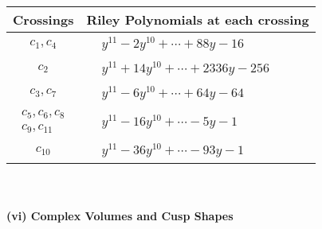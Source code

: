 \documentclass[1p]{elsarticle_modified}
\theoremstyle{definition}
\begin{document}
\begin{tabular}{m{50pt}|m{274pt}}
Crossings & \hspace{64pt}Riley Polynomials at each crossing \\
\hline $$\begin{aligned}c_{1},c_{4}\end{aligned}$$&$\begin{aligned}
&y^{11}-2 y^{10}+\cdots+88 y-16
\end{aligned}$\\
\hline $$\begin{aligned}c_{2}\end{aligned}$$&$\begin{aligned}
&y^{11}+14 y^{10}+\cdots+2336 y-256
\end{aligned}$\\
\hline $$\begin{aligned}c_{3},c_{7}\end{aligned}$$&$\begin{aligned}
&y^{11}-6 y^{10}+\cdots+64 y-64
\end{aligned}$\\
\hline $$\begin{aligned}c_{5},c_{6},c_{8}\\c_{9},c_{11}\end{aligned}$$&$\begin{aligned}
&y^{11}-16 y^{10}+\cdots-5 y-1
\end{aligned}$\\
\hline $$\begin{aligned}c_{10}\end{aligned}$$&$\begin{aligned}
&y^{11}-36 y^{10}+\cdots-93 y-1
\end{aligned}$\\
\hline
\end{tabular}\\~\\
\newpage\flushleft \textbf{(vi) Complex Volumes and Cusp Shapes}
\end{document}
